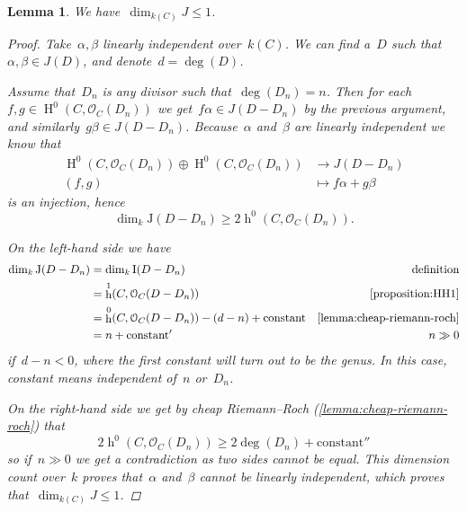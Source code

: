 \documentclass[10pt,a4paper]{article}
\theoremstyle{lecture}
\newtheorem{lemma}[theorem]{Lemma}
\DeclareMathOperator\hh{h}
\DeclareMathOperator\HH{H}
\begin{document}
\begin{lemma}
  \label{lemma:dim(J)<=1}
  We have~$\dim_{k(C)}J\leq 1$.
  \begin{proof}
    Take~$\alpha,\beta$ linearly independent over~$k(C)$. We can find a~$D$ such that~$\alpha,\beta\in J(D)$, and denote~$d=\deg(D)$.

    Assume that~$D_n$ is any divisor such that~$\deg(D_n)=n$. Then for each~$f,g\in\HH^0(C,\mathcal{O}_C(D_n))$ we get~$f\alpha\in J(D-D_n)$ by the previous argument, and similarly~$g\beta\in J(D-D_n)$. Because~$\alpha$ and~$\beta$ are linearly independent we know that
    \begin{equation}
      \begin{aligned}
        \HH^0(C,\mathcal{O}_C(D_n))\oplus\HH^0(C,\mathcal{O}_C(D_n))&\to J(D-D_n) \\
        (f,g)&\mapsto f\alpha+g\beta
      \end{aligned}
    \end{equation}
    is an injection, hence
    \begin{equation}
      \dim_k\mathrm{J}(D-D_n)\geq 2\hh^0(C,\mathcal{O}_C(D_n)).
    \end{equation}

    On the left-hand side we have
    \begin{equation}
      \begin{aligned}
        \dim_k\mathrm{J}(D-D_n)&=\dim_k\mathrm{I}(D-D_n) & \text{definition} \\
        &=\hh^1(C,\mathcal{O}_C(D-D_n)) & \text{\cref{proposition:HH1}} \\
        &=\hh^0(C,\mathcal{O}_C(D-D_n))-(d-n)+\text{constant} & \text{\cref{lemma:cheap-riemann-roch}} \\
        &=n+\text{constant}' & n\gg 0
      \end{aligned}
    \end{equation}
    if~$d-n<0$, where the first constant will turn out to be the genus. In this case, constant means independent of~$n$ or~$D_n$.

    On the right-hand side we get by cheap Riemann--Roch (\cref{lemma:cheap-riemann-roch}) that
    \begin{equation}
      2\hh^0(C,\mathcal{O}_C(D_n))\geq 2\deg(D_n)+\text{constant}''
    \end{equation}
    so if~$n\gg 0$ we get a contradiction as two sides cannot be equal. This dimension count over~$k$ proves that~$\alpha$ and~$\beta$ cannot be linearly independent, which proves that~$\dim_{k(C)}J\leq 1$.
  \end{proof}
\end{lemma}
\end{document}
